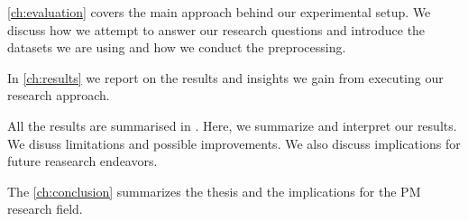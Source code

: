 \documentclass[./../../paper.tex]{subfiles}
\begin{document}
    \autoref{ch:evaluation} covers the main approach behind our experimental setup. We discuss how we attempt to answer our research questions and introduce the datasets we are using and how we conduct the preprocessing. 

    In \autoref{ch:results} we report on the results and insights we gain from executing our research approach. 
    
    All the results are summarised in \autocite{ch:discussion}. Here, we summarize and interpret our results. We disuss limitations and possible improvements. We also discuss implications for future reasearch endeavors. 

    The \autoref{ch:conclusion} summarizes the thesis and the implications for the \Gls{PM} research field.
    
\end{document}
